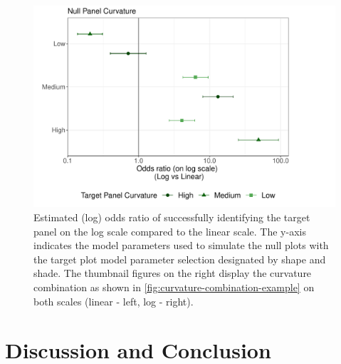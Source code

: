\documentclass[12pt]{article}
\begin{document}
\begin{figure}[tbp]

{\centering \includegraphics[width=\linewidth,]{logarithmic-lineups-revisions_files/figure-latex/odds-ratio-plot-1} 

}

\caption[Lineups log(odds) results]{Estimated (log) odds ratio of successfully identifying the target panel on the log scale compared to the linear scale. The y-axis indicates the model parameters used to simulate the null plots with the target plot model parameter selection designated by shape and shade. The thumbnail figures on the right display the curvature combination as shown in \cref{fig:curvature-combination-example} on both scales (linear - left, log - right).}\label{fig:odds-ratio-plot}
\end{figure}

\hypertarget{discussion-conclusion}{%
\section{Discussion and Conclusion}\label{discussion-conclusion}}
\end{document}
